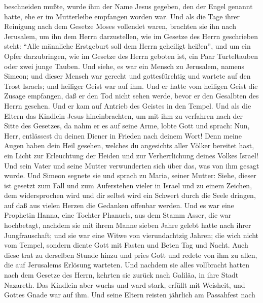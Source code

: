 beschneiden mußte, wurde ihm der Name Jesus gegeben, den der Engel
genannt hatte, ehe er im Mutterleibe empfangen worden war.
 Und als die Tage ihrer Reinigung nach dem Gesetze Moses
vollendet waren, brachten sie ihn nach Jerusalem, um ihn dem Herrn
darzustellen,  wie im Gesetze des Herrn geschrieben
steht: ``Alle männliche Erstgeburt soll dem Herrn geheiligt heißen'',
 und um ein Opfer darzubringen, wie im Gesetze des Herrn
geboten ist, ein Paar Turteltauben oder zwei junge Tauben.
 Und siehe, es war ein Mensch zu Jerusalem, namens
Simeon; und dieser Mensch war gerecht und gottesfürchtig und wartete auf
den Trost Israels; und heiliger Geist war auf ihm.  Und
er hatte vom heiligen Geist die Zusage empfangen, daß er den Tod nicht
sehen werde, bevor er den Gesalbten des Herrn gesehen. 
Und er kam auf Antrieb des Geistes in den Tempel. Und als die Eltern das
Kindlein Jesus hineinbrachten, um mit ihm zu verfahren nach der Sitte
des Gesetzes,  da nahm er es auf seine Arme, lobte Gott
und sprach:  Nun, Herr, entlässest du deinen Diener in
Frieden nach deinem Wort!  Denn meine Augen haben dein
Heil gesehen,  welches du angesichts aller Völker
bereitet hast,  ein Licht zur Erleuchtung der Heiden und
zur Verherrlichung deines Volkes Israel!  Und sein Vater
und seine Mutter verwunderten sich über das, was von ihm gesagt wurde.
 Und Simeon segnete sie und sprach zu Maria, seiner
Mutter: Siehe, dieser ist gesetzt zum Fall und zum Auferstehen vieler in
Israel und zu einem Zeichen, dem widersprochen wird  und
dir selbst wird ein Schwert durch die Seele dringen, auf daß aus vielen
Herzen die Gedanken offenbar werden.  Und es war eine
Prophetin Hanna, eine Tochter Phanuels, aus dem Stamm Asser, die war
hochbetagt, nachdem sie mit ihrem Manne sieben Jahre gelebt hatte nach
ihrer Jungfrauschaft;  und sie war eine Witwe von
vierundachtzig Jahren; die wich nicht vom Tempel, sondern diente Gott
mit Fasten und Beten Tag und Nacht.  Auch diese trat zu
derselben Stunde hinzu und pries Gott und redete von ihm zu allen, die
auf Jerusalems Erlösung warteten.  Und nachdem sie alles
vollbracht hatten nach dem Gesetze des Herrn, kehrten sie zurück nach
Galiläa, in ihre Stadt Nazareth.  Das Kindlein aber wuchs
und ward stark, erfüllt mit Weisheit, und Gottes Gnade war auf ihm.
 Und seine Eltern reisten jährlich am Passahfest nach

